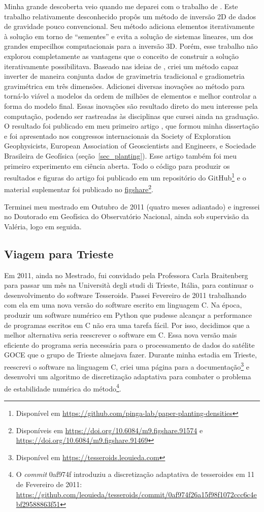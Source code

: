 \documentclass[10pt,a4paper,oneside]{book}
\newcommand{\Trieste}{Università degli studi di Trieste}
\begin{document}
Minha grande descoberta veio quando me deparei com o trabalho de
\citet{Rene1986}.
Este trabalho relativamente desconhecido propôs um método de inversão 2D de
dados de gravidade pouco convencional.
Seu método adiciona elementos iterativamente à solução em torno de ``sementes''
e evita a solução de sistemas lineares, um dos grandes empecilhos
computacionais para a inversão 3D.
Porém, esse trabalho não explorou completamente as vantagens que o conceito de
construir a solução iterativamente possibilitava.
Baseado nas ideias de \citet{Rene1986}, criei um método capaz inverter de
maneira conjunta dados de gravimetria tradicional e gradiometria gravimétrica
em três dimensões.
Adicionei diversas inovações ao método para torná-lo viável a modelos da ordem
de milhões de elementos e melhor controlar a forma do modelo final.
Essas inovações são resultado direto do meu interesse pela computação, podendo
ser rastreadas às disciplinas que cursei ainda na graduação.
O resultado foi publicado em meu primeiro artigo \citep{Uieda2012}, que formou minha
dissertação e foi apresentado nos congressos internacionais da
Society of Exploration Geophysicists,
European Association of Geoscientists and Engineers,
e Sociedade Brasileira de Geofísica
(seção~\ref{sec_planting}).
Esse artigo também foi meu primeiro experimento em ciência aberta.
Todo o código para produzir os resultados e figuras do artigo foi publicado
em um repositório do GitHub\footnote{Disponível em
\url{https://github.com/pinga-lab/paper-planting-densities}} e o material
suplementar foi publicado no
\href{https://figshare.com/}{figshare}\footnote{Disponíveis em
\url{https://doi.org/10.6084/m9.figshare.91574} e
\url{https://doi.org/10.6084/m9.figshare.91469}}.

Terminei meu mestrado em Outubro de 2011 (quatro meses adiantado) e ingressei
no Doutorado em Geofísica do Observatório Nacional, ainda sob supervisão da
Valéria, logo em seguida.

\subsection{Viagem para Trieste}

Em 2011, ainda no Mestrado, fui convidado pela Professora Carla Braitenberg
para passar um mês na \Trieste{}, Itália, para continuar
o desenvolvimento do software Tesseroids.
Passei Fevereiro de 2011 trabalhando com ela em uma nova versão do software
escrito em linguagem C.
Na época, produzir um software numérico em Python que pudesse alcançar a
performance de programas escritos em C não era uma tarefa fácil.
Por isso, decidimos que a melhor alternativa seria reescrever o software em C.
Essa nova versão mais eficiente do programa seria necessária para o
processamento de dados do satélite GOCE que o grupo de Trieste almejava fazer.
Durante minha estadia em Trieste, reescrevi o software na linguagem C, criei
uma página para a documentação\footnote{Disponível em \url{https://tesseroids.leouieda.com}}
e desenvolvi um algoritmo de discretização adaptativa para combater o problema
de estabilidade numérica do método\footnote{O \textit{commit} 0af974f
introduziu a discretização adaptativa de tesseroides em 11 de Fevereiro de
2011:
\url{https://github.com/leouieda/tesseroids/commit/0af974f26a15f98f1072ccc6c4ebf29588863f51}}.
\end{document}
